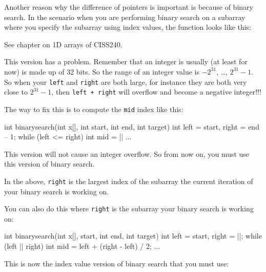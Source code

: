 Another reason why the difference of pointers is important is because of binary search. In the scenario when you are performing binary search on a subarray where you specify the subarray using index values, the function looks like this:

\begin{consolethree}[escapeinside=||]
int binarysearch(int x[], int start, int end,
                 int target)
{
    int left = start, right = end -- 1;
    while (left <= right)
    {
        int mid = (left + right) / 2};
        ...
    }
}
\end{consolethree}

See chapter on 1D arrays of CISS240.

This version has a problem. Remember that an integer is usually (at least for now) is made up of 32 bits. So the range of an integer value is $-2^{31}$, \ldots, $2^{31} - 1$. So when your \texttt{left} and \texttt{right} are both large, for instance they are both very close to $2^{31} - 1$, then \texttt{left + right} will overflow and become a negative integer!!!

The way to fix this is to compute the \texttt{mid} index like this:

\begin{consolethree}[escapeinside=||]
int binarysearch(int x[], int start, int end,
                 int target)
{
    int left = start, right = end -- 1;
    while (left <= right)
    {
        int mid = ||
        ...
    }
}
\end{consolethree}

This version will not cause an integer overflow. So from now on, you must use this version of binary search.

In the above, \texttt{right} is the largest index of the subarray the current iteration of your binary search is working on.

You can also do this where \texttt{right} is  the subarray your binary search is working on:

\begin{consolethree}[escapeinside=||]
int binarysearch(int x[], start, int end,
                 int target)
{
    int left = start, right = ||;
    while (left |\EMPHASIZE{ <}| right)
    {
        int mid = left + (right - left) / 2;
        ...
    }
}
\end{consolethree}

This is now the index value version of binary search that you must use:

